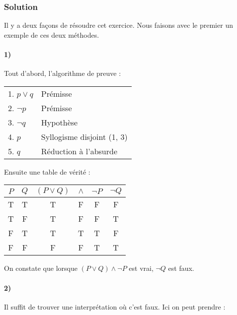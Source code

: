     \subsubsection{Solution}
    Il y a deux façons de résoudre cet exercice.
    Nous faisons avec le premier un exemple de ces deux méthodes.

    \paragraph{1)}
    Tout d'abord, l'algorithme de preuve :

    \begin{center}
    \begin{tabular}{|l|l|}
    \hline
    1. $p \lor q$ & Prémisse \\
    2. $\lnot p$ & Prémisse \\
    \hspace{0.5cm} 3. $\lnot q$ & Hypothèse \\
    \hspace{0.5cm} 4. $p$ & Syllogisme disjoint (1, 3) \\ 
    5. $q$ & Réduction à l'absurde \\
    \hline
    \end{tabular}
    \end{center}

    Ensuite une table de vérité :

    \begin{center}
    	\begin{tabular}{cc|ccc|c}
    		$P$ & $Q$ & $(P \lor Q) $ & $\land$ & $\neg P$ & $\neg Q$ \\
    		\hline
    		T & T & T & F & F & F\\
    		T & F & T & F & F & T\\
    		F & T & T & \color{red}T & T & \color{red}F\\ 
    		F & F & F & F & T & T\\
    	\end{tabular}
    \end{center}
    
    On constate que lorsque $(P \lor Q) \land \neg P$ est vrai, $\neg Q$ est faux.
    
    \paragraph{2)}
    Il suffit de trouver une interprétation où c'est faux. Ici on peut prendre :
    
